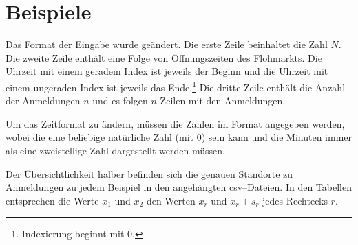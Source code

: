 \newpage
\section{Beispiele}
Das Format der Eingabe wurde geändert. 
Die erste Zeile beinhaltet die Zahl $N$.
Die zweite Zeile enthält eine Folge von Öffnungszeiten des Flohmarkts.
Die Uhrzeit mit einem geradem Index ist jeweils der Beginn und die Uhrzeit 
mit einem ungeraden Index ist jeweils das Ende.\footnote{Indexierung beginnt mit 0.}
Die dritte Zeile enthält die Anzahl der Anmeldungen $n$ und es folgen $n$ Zeilen mit den Anmeldungen.

Um das Zeitformat zu ändern, müssen die Zahlen im Format  angegeben werden, wobei 
die  eine beliebige natürliche Zahl (mit 0) sein kann und
die Minuten  immer als eine zweistellige Zahl dargestellt werden müssen.

Der Übersichtlichkeit halber befinden sich die genauen Standorte zu Anmeldungen
zu jedem Beispiel in den angehängten csv--Dateien.
In den Tabellen entsprechen die Werte $x_1$ und $x_2$ den Werten 
$x_r$ und $x_r + s_r$ jedes Rechtecks $r$.












